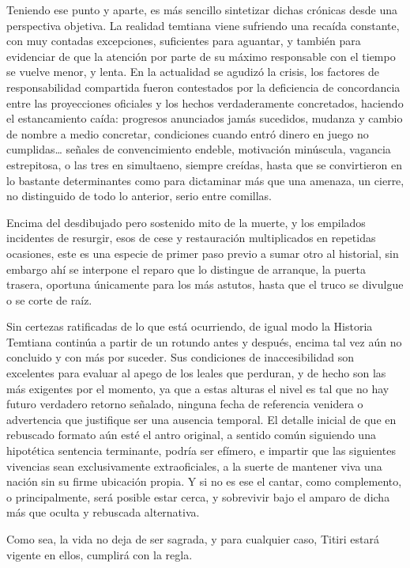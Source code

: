 \documentclass[
]{book}
\begin{document}
Teniendo ese punto y aparte, es más sencillo sintetizar dichas crónicas desde una perspectiva objetiva. La realidad temtiana viene sufriendo una recaída constante, con muy contadas excepciones, suficientes para aguantar, y también para evidenciar de que la atención por parte de su máximo responsable con el tiempo se vuelve menor, y lenta. En la actualidad se agudizó la crisis, los factores de responsabilidad compartida fueron contestados por la deficiencia de concordancia entre las proyecciones oficiales y los hechos verdaderamente concretados, haciendo el estancamiento caída: progresos anunciados jamás sucedidos, mudanza y cambio de nombre a medio concretar, condiciones cuando entró dinero en juego no cumplidas\ldots{} señales de convencimiento endeble, motivación minúscula, vagancia estrepitosa, o las tres en simultaeno, siempre creídas, hasta que se convirtieron en lo bastante determinantes como para dictaminar más que una amenaza, un cierre, no distinguido de todo lo anterior, serio entre comillas.

Encima del desdibujado pero sostenido mito de la muerte, y los empilados incidentes de resurgir, esos de cese y restauración multiplicados en repetidas ocasiones, este es una especie de primer paso previo a sumar otro al historial, sin embargo ahí se interpone el reparo que lo distingue de arranque, la puerta trasera, oportuna únicamente para los más astutos, hasta que el truco se divulgue o se corte de raíz.

Sin certezas ratificadas de lo que está ocurriendo, de igual modo la Historia Temtiana continúa a partir de un rotundo antes y después, encima tal vez aún no concluido y con más por suceder. Sus condiciones de inaccesibilidad son excelentes para evaluar al apego de los leales que perduran, y de hecho son las más exigentes por el momento, ya que a estas alturas el nivel es tal que no hay futuro verdadero retorno señalado, ninguna fecha de referencia venidera o advertencia que justifique ser una ausencia temporal. El detalle inicial de que en rebuscado formato aún esté el antro original, a sentido común siguiendo una hipotética sentencia terminante, podría ser efímero, e impartir que las siguientes vivencias sean exclusivamente extraoficiales, a la suerte de mantener viva una nación sin su firme ubicación propia. Y si no es ese el cantar, como complemento, o principalmente, será posible estar cerca, y sobrevivir bajo el amparo de dicha más que oculta y rebuscada alternativa.

Como sea, la vida no deja de ser sagrada, y para cualquier caso, Titiri estará vigente en ellos, cumplirá con la regla.
\end{document}
